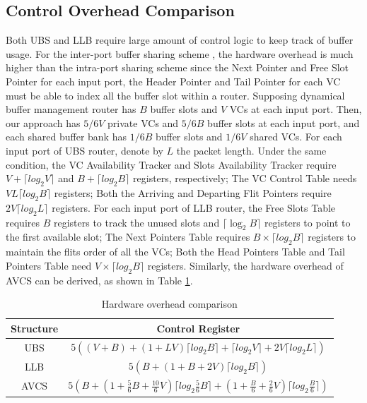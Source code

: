 \documentclass[paper]{ieice}
\begin{document}
\subsection{Control Overhead Comparison}\label{controllogic}
Both UBS \cite{NPKV06}\cite{5770788} and LLB \cite{4555894}\cite{Neishaburi:2009:RAN:1531542.1531658} require large amount of control logic to keep track of buffer usage. For the inter-port buffer sharing scheme \cite{Neishaburi:2009:RAN:1531542.1531658}, the hardware overhead is much higher than the intra-port sharing scheme since the Next Pointer and Free Slot Pointer for each input port, the Header Pointer and Tail Pointer for each VC must be able to index all the buffer slot within a router. Supposing dynamical buffer management router \cite{NPKV06}\cite{4555894}\cite{Neishaburi:2009:RAN:1531542.1531658}\cite{5770788} has $B$ buffer slots and $V$ VCs at each input port. Then, our approach has $5/6V$ private VCs and $5/6B$ buffer slots at each input port, and each shared buffer bank has $1/6B$ buffer slots and $1/6V$ shared VCs. For each input port of UBS router, denote by $L$ the packet length. Under the same condition, the VC Availability Tracker and Slots Availability Tracker require $V+\lceil log_2 V\rceil$ and $B+\lceil log_2B\rceil$ registers, respectively; The VC Control Table needs $VL\lceil log_2B\rceil$ registers; Both the Arriving and Departing Flit Pointers require $2V\lceil log_2 L\rceil$ registers. For each input port of LLB router, the Free Slots Table requires $B$ registers to track the unused slots and $\lceil \log_2 B\rceil$ registers to point to the first available slot; The Next Pointers Table requires $B\times \lceil log_2 B\rceil$ registers to maintain the flits order of all the VCs; Both the Head Pointers Table and Tail Pointers Table need $V\times \lceil log_2 B\rceil$ registers. Similarly, the hardware overhead of AVCS can be derived, as shown in Table \ref{control}.
\begin{table}
\caption{Hardware overhead comparison}\label{control}
\centering\begin{tabular}{c|c}
\hline
\hline
Structure & Control Register\\
\hline
UBS \cite{NPKV06}  &   $5((V+B)+(1+LV)\lceil log_2B\rceil+\lceil log_2V\rceil+2V\lceil log_2L\rceil)$\\
\hline
LLB \cite{4555894} & $5(B+(1+B+2V) \lceil log_2B\rceil)$\\
\hline
AVCS    & $5(B+(1+\frac{5}{6}B+\frac{10}{6}V)\lceil log_2\frac{5}{6}B\rceil +(1+\frac{B}{6}+\frac{2}{6}V)\lceil log_2\frac{B}{6}\rceil)$\\
\hline
\end{tabular}
\end{table}
\end{document}
